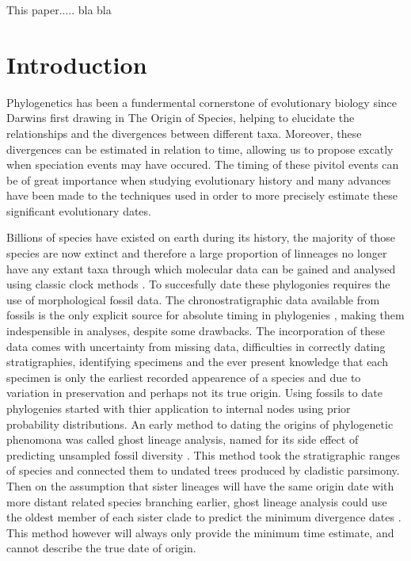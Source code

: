 \documentclass[11pt,letterpaper]{article}
\begin{document}
This paper..... bla bla 

\newpage

\tableofcontents

\newpage

\section{Introduction}

Phylogenetics has been a fundermental cornerstone of evolutionary biology since Darwins first drawing in The Origin of Species, helping to elucidate the relationships and the divergences between different taxa. Moreover, these divergences can be estimated in relation to time, allowing us to propose excatly when speciation events may have occured. The timing of these pivitol events can be of great importance when studying evolutionary history and many advances have been made to the techniques used in order to more precisely estimate these significant evolutionary dates.

Billions of species have existed on earth during its history, the majority of those species are now extinct and therefore a large proportion of linneages no longer have any extant taxa through which molecular data can be gained and analysed using classic clock methods \citep{turner2017empirical}. To succesfully date these phylogonies requires the  use of morphological fossil data. The chronostratigraphic data available from fossils is the only explicit source for absolute timing in phylogenies \citep{turner2017empirical}, making them indespensible in analyses, despite some drawbacks. The incorporation of these data comes with uncertainty from missing data, difficulties in correctly dating stratigraphies, identifying specimens and the ever present knowledge that each specimen is only the earliest recorded appearence of a species and due to variation in preservation and perhaps not its true origin. Using fossils to date phylogenies started with thier application to internal nodes using prior probability distributions. An early method to dating the origins of phylogenetic phenomona was called ghost lineage analysis, named for its side effect of predicting unsampled fossil diversity \citep{norell1992taxic}. This method took the stratigraphic ranges of species and connected them to undated trees produced by cladistic parsimony. Then on the assumption that sister lineages will have the same origin date with more distant related species branching earlier, ghost lineage analysis could use the oldest member of each sister clade to predict the minimum divergence dates \citep{norell1992taxic}. This method however will always only provide the minimum time estimate, and cannot describe the true date of origin. 
\end{document}
